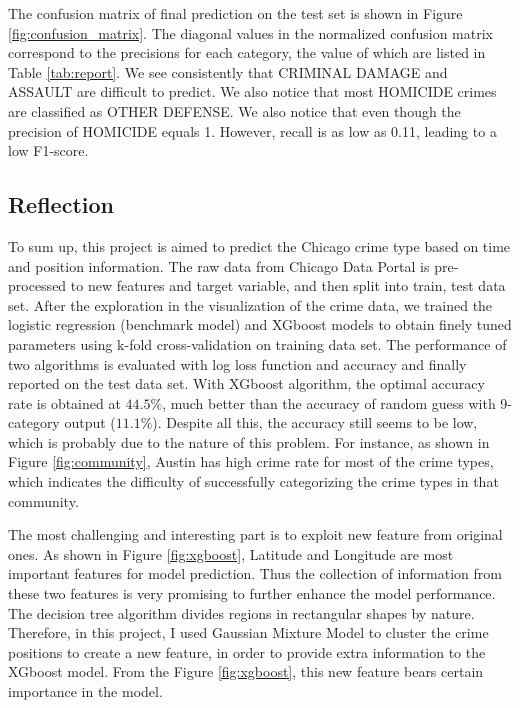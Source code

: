 \documentclass[12pt]{article}
\begin{document}
The confusion matrix of final prediction on the test set is shown in Figure \ref{fig:confusion_matrix}. The diagonal values in the normalized confusion matrix correspond to the precisions for each category, the value of which are listed in Table \ref{tab:report}. We see consistently that CRIMINAL DAMAGE and ASSAULT are difficult to predict. We also notice that most HOMICIDE crimes are classified as OTHER DEFENSE. We also notice that even though the precision of HOMICIDE equals 1. However, recall is as low as 0.11, leading to a low F1-score.




\subsection{Reflection}
To sum up, this project is aimed to predict the Chicago crime type based on time and position information. The raw data from Chicago Data Portal is pre-processed to new features and target variable, and then split into train, test data set. After the exploration in the visualization of the crime data, we trained the logistic regression (benchmark model) and XGboost models to obtain finely tuned parameters using k-fold cross-validation on training data set. The performance of two algorithms is evaluated with log loss function and accuracy and finally reported on the test data set. With XGboost algorithm, the optimal accuracy rate is obtained at $44.5\%$, much better than the accuracy of random guess with 9-category output ($11.1\%$). Despite all this, the accuracy still seems to be low, which is probably due to the nature of this problem. For instance, as shown in Figure \ref{fig:community}, Austin has high crime rate for most of the crime types, which indicates the difficulty of successfully categorizing the crime types in that community. 

The most challenging and interesting part is to exploit new feature from original ones. As shown in Figure \ref{fig:xgboost}, Latitude and Longitude are most important features for model prediction. Thus the collection of information from these two features is very promising to further enhance the model performance. The decision tree algorithm divides regions in rectangular shapes by nature. Therefore, in this project, I used Gaussian Mixture Model to cluster the crime positions to create a new feature, in order to provide extra information to the XGboost model. From the Figure \ref{fig:xgboost}, this new feature bears certain importance in the model.
\end{document}
